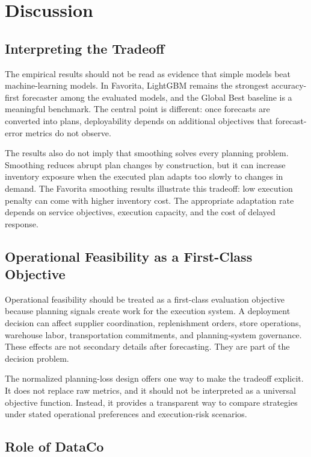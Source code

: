 \section{Discussion}

\subsection{Interpreting the Tradeoff}

The empirical results should not be read as evidence that simple models beat machine-learning models. In Favorita, LightGBM remains the strongest accuracy-first forecaster among the evaluated models, and the Global Best baseline is a meaningful benchmark. The central point is different: once forecasts are converted into plans, deployability depends on additional objectives that forecast-error metrics do not observe.

The results also do not imply that smoothing solves every planning problem. Smoothing reduces abrupt plan changes by construction, but it can increase inventory exposure when the executed plan adapts too slowly to changes in demand. The Favorita smoothing results illustrate this tradeoff: low execution penalty can come with higher inventory cost. The appropriate adaptation rate depends on service objectives, execution capacity, and the cost of delayed response.

\subsection{Operational Feasibility as a First-Class Objective}

Operational feasibility should be treated as a first-class evaluation objective because planning signals create work for the execution system. A deployment decision can affect supplier coordination, replenishment orders, store operations, warehouse labor, transportation commitments, and planning-system governance. These effects are not secondary details after forecasting. They are part of the decision problem.

The normalized planning-loss design offers one way to make the tradeoff explicit. It does not replace raw metrics, and it should not be interpreted as a universal objective function. Instead, it provides a transparent way to compare strategies under stated operational preferences and execution-risk scenarios.

\subsection{Role of DataCo}

